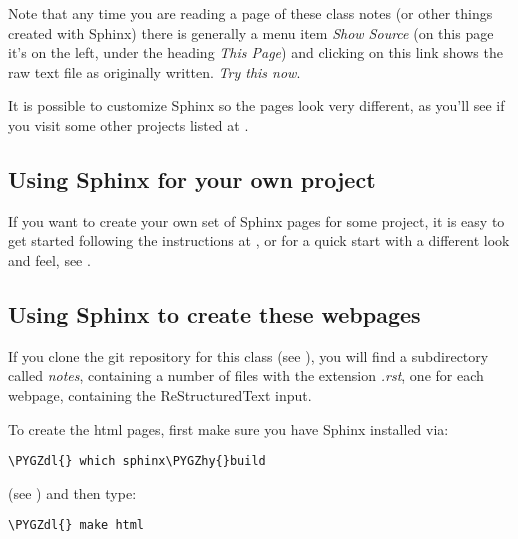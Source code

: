 \documentclass[letterpaper,10pt,english]{sphinxmanual}
\def\PYGZdl{\char`\$}
\def\PYGZhy{\char`\-}
\begin{document}
Note that any time you are reading a page of these class notes (or other
things created with Sphinx) there is generally a menu item \emph{Show Source} (on
this page it's on the left, under the heading \emph{This Page}) and clicking on
this link shows the raw text file as originally written.  \emph{Try this now}.

It is possible to customize Sphinx so the pages look very different, as
you'll see if you visit some other projects listed at \label{sphinx:id8}{\hyperref[biblio:sphinx\string-examples]{}}.


\subsection{Using Sphinx for your own project}
\label{sphinx:using-sphinx-for-your-own-project}
If you want to create your own set of Sphinx pages for some project, it is
easy to get started following the instructions at \label{sphinx:id9}{\hyperref[biblio:sphinx]{\crossref{{[}sphinx{]}}}}, or for a quick
start with a different look and feel, see \label{sphinx:id10}{\hyperref[biblio:sphinx\string-sampledoc]{}}.


\subsection{Using Sphinx to create these webpages}
\label{sphinx:using-sphinx-to-create-these-webpages}
If you clone the git repository for this class (see {\hyperref[git:git]{}}), you will find
a subdirectory called \emph{notes}, containing a number of files with the
extension \emph{.rst}, one for each webpage, containing the ReStructuredText
input.

To create the html pages, first make sure you have Sphinx installed via:

\begin{Verbatim}[commandchars=\\\{\}]
\PYGZdl{} which sphinx\PYGZhy{}build
\end{Verbatim}

(see {\hyperref[software_installation:software\string-installation]{}}) and then type:

\begin{Verbatim}[commandchars=\\\{\}]
\PYGZdl{} make html
\end{Verbatim}
\end{document}
